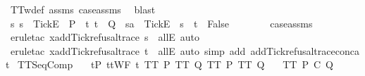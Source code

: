 \begin{isabellebody}
{\ TT{}w{\isacharunderscore}def\ assms{\isacharparenleft}{}{\isacharparenright}\ case{\isacharunderscore}assms{\isacharparenleft}{}{\isacharparenright}\ \isamarkupfalse%
\ blast\isanewline
\ \ \isamarkupfalse%
\ {\isachardoublequoteopen}{\isasymforall}s{\isachardot}\ s\ {\isacharat}\ {\isacharbrackleft}{\isacharbrackleft}Tick{\isacharbrackright}\isactrlsub E{\isacharbrackright}\ {\isasymin}\ P\ {\isasymlongrightarrow}\ {\isacharparenleft}{\isasymforall}t{\isachardot}\ t\ {\isasymin}\ Q\ {\isasymlongrightarrow}\ sa\ {\isacharat}\ {\isacharbrackleft}{\isacharbrackleft}Tick{\isacharbrackright}\isactrlsub E{\isacharbrackright}\ {\isasymnoteq}\ s\ {\isacharat}\ t{\isacharparenright}\ {\isasymLongrightarrow}\ False{\isachardoublequoteclose}\isanewline
\ \ \ \ \isamarkupfalse%
\ {}\ {}\ case{\isacharunderscore}assms\ \isamarkupfalse%
\ {\isacharparenleft}erule{\isacharunderscore}tac\ x{\isacharequal}{\isachardoublequoteopen}add{\isacharunderscore}Tick{\isacharunderscore}refusal{\isacharunderscore}trace\ s{\isachardoublequoteclose}\ \ allE{\isacharcomma}\ auto{\isacharparenright}\isanewline
\ \ \ \ \isamarkupfalse%
\ {\isacharparenleft}erule{\isacharunderscore}tac\ x{\isacharequal}{\isachardoublequoteopen}add{\isacharunderscore}Tick{\isacharunderscore}refusal{\isacharunderscore}trace\ t{\isachardoublequoteclose}\ \ allE{\isacharcomma}\ auto\ simp\ add{\isacharcolon}\ add{\isacharunderscore}Tick{\isacharunderscore}refusal{\isacharunderscore}trace{\isacharunderscore}concat{\isacharparenright}\isanewline
{}\isamarkupfalse%
%
\endisatagproof
{\isafoldproof}%
%
\isadelimproof
%
\endisadelimproof
%
}%
\isamarkupfalse%
\ TT{}{\isacharunderscore}SeqComp{\isacharcolon}\isanewline
\ \ \ {\isachardoublequoteopen}{\isasymforall}t{\isasymin}P{\isachardot}\ ttWF\ t{\isachardoublequoteclose}\ {\isachardoublequoteopen}TT{}\ P{\isachardoublequoteclose}\ {\isachardoublequoteopen}TT{}\ Q{\isachardoublequoteclose}\ {\isachardoublequoteopen}TT{}\ P{\isachardoublequoteclose}\ {\isachardoublequoteopen}TT{}\ Q{\isachardoublequoteclose}\isanewline
\ \ \ {\isachardoublequoteopen}TT{}\ {\isacharparenleft}P\ {\isacharsemicolon}\isactrlsub C\ Q{\isacharparenright}{\isachardoublequoteclose}\isanewline
%
\isadelimproof
\ \ %
\endisadelimproof
%
\isatagproof
{}\isamarkupfalse%

\end{isabellebody}
